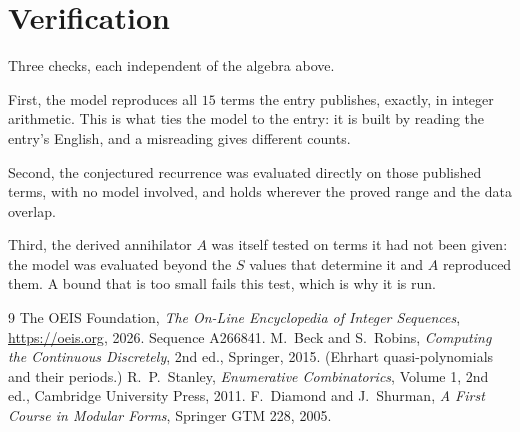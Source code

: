 \documentclass[11pt,a4paper]{article}
\theoremstyle{plain}
\theoremstyle{definition}
\begin{document}
\section{Verification}

Three checks, each independent of the algebra above.

First, the model reproduces all $15$ terms the entry publishes, exactly, in integer
arithmetic. This is what ties the model to the entry: it is built by reading the entry's
English, and a misreading gives different counts.

Second, the conjectured recurrence was evaluated directly on those published terms, with no
model involved, and holds wherever the proved range and the data overlap.

Third, the derived annihilator $A$ was itself tested on terms it had not been given: the model
was evaluated beyond the $S$ values that determine it and $A$ reproduced them. A bound that is
too small fails this test, which is why it is run.

\begin{thebibliography}{9}
 The OEIS Foundation, \emph{The On-Line Encyclopedia of Integer
Sequences}, \url{https://oeis.org}, 2026. Sequence A266841.
 M.~Beck and S.~Robins, \emph{Computing the Continuous Discretely},
2nd ed., Springer, 2015. (Ehrhart quasi-polynomials and their periods.)
 R.~P.~Stanley, \emph{Enumerative Combinatorics}, Volume 1, 2nd ed.,
Cambridge University Press, 2011.
 F.~Diamond and J.~Shurman, \emph{A First Course in Modular Forms},
Springer GTM 228, 2005.
\end{thebibliography}
\end{document}
